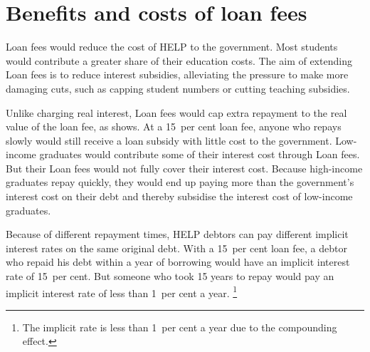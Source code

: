 \documentclass[embargoed]{grattan}
\begin{document}
\section{Benefits and costs of loan fees}\label{sec:benefits-and-costs-of-loan-fees}

\Gls{Loan fees} would reduce the cost of \gls{HELP} to the government.
Most students would contribute a greater share of their education costs.
The aim of extending \gls{Loan fees} is to reduce interest subsidies, alleviating the pressure to make more damaging cuts, such as capping student numbers or cutting teaching subsidies.

Unlike charging real interest, \gls{Loan fees} would cap extra repayment to the real value of the loan fee, as  shows.
At a 15~per cent loan fee, anyone who repays slowly would still receive a loan subsidy with little cost to the government.
Low-income graduates would contribute some of their interest cost through \gls{Loan fees}.
But their \gls{Loan fees} would not fully cover their interest cost.
Because high-income graduates repay quickly, they would end up paying more than the government's interest cost on their debt and thereby subsidise the interest cost of low-income graduates.

Because of different repayment times, \gls{HELP} debtors can pay different implicit interest rates on the same original debt.
With a 15~per cent loan fee, a debtor who repaid his debt within a year of borrowing would have an implicit interest rate of 15~per cent.
But someone who took 15 years to repay would pay an implicit interest rate of less than 1~per cent a year.%
\footnote{The implicit rate is less than 1~per cent a year due to the compounding effect.}
\end{document}
